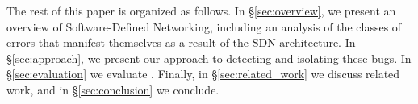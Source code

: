 The rest of this paper is organized as follows. In \S\ref{sec:overview},
we present an overview of Software-Defined Networking, including an analysis
of the classes of errors that manifest themselves as a result of the SDN architecture.
In \S\ref{sec:approach}, we present our approach to
detecting and isolating these bugs. In \S\ref{sec:evaluation} we evaluate \projectname{}.
Finally, in \S\ref{sec:related_work} we discuss related work, and in \S\ref{sec:conclusion} we conclude.

